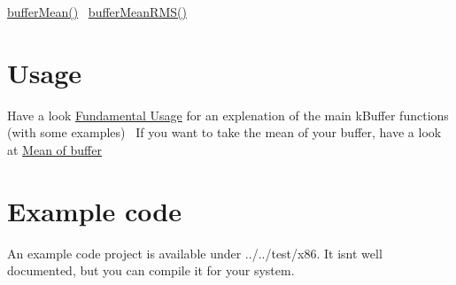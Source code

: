  \hyperlink{k_buffer_8c_a1389f5c08210e077301c35bc3b43f681}{buffer\+Mean()}~\newline
 \hyperlink{k_buffer_8c_a1da694b34c0a52809c923d2d149d1348}{buffer\+Mean\+R\+M\+S()}~\newline
 \hypertarget{index_usage}{}\section{Usage}\label{index_usage}
Have a look \hyperlink{fundamental_usage}{Fundamental Usage} for an explenation of the main k\+Buffer functions (with some examples)~\newline
 If you want to take the mean of your buffer, have a look at \hyperlink{mean}{Mean of buffer} \hypertarget{index_example}{}\section{Example code}\label{index_example}
An example code project is available under ../../test/x86. It isn\textquotesingle{}t well documented, but you can compile it for your system. 